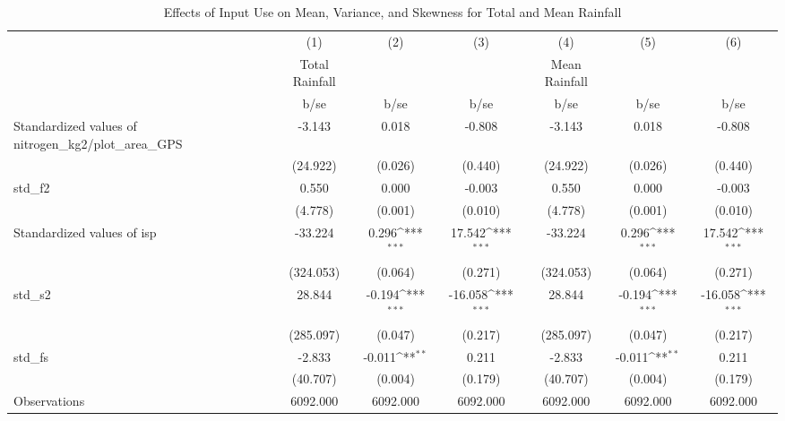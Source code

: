 \begin{table}[htbp]\centering
\def\sym#1{\ifmmode^{#1}\else\(^{#1}\)\fi}
\caption{Effects of Input Use on Mean, Variance, and Skewness for Total and Mean Rainfall}
\begin{tabular}{l*{6}{c}}
\toprule
                &\multicolumn{1}{c}{(1)}&\multicolumn{1}{c}{(2)}&\multicolumn{1}{c}{(3)}&\multicolumn{1}{c}{(4)}&\multicolumn{1}{c}{(5)}&\multicolumn{1}{c}{(6)}\\
                &\multicolumn{1}{c}{Total Rainfall}&\multicolumn{1}{c}{}&\multicolumn{1}{c}{}&\multicolumn{1}{c}{Mean Rainfall}&\multicolumn{1}{c}{}&\multicolumn{1}{c}{}\\
                &     b/se         &     b/se         &     b/se         &     b/se         &     b/se         &     b/se         \\
\midrule
Standardized values of nitrogen\_kg2/plot\_area\_GPS&   -3.143         &    0.018         &   -0.808         &   -3.143         &    0.018         &   -0.808         \\
                & (24.922)         &  (0.026)         &  (0.440)         & (24.922)         &  (0.026)         &  (0.440)         \\
std\_f2          &    0.550         &    0.000         &   -0.003         &    0.550         &    0.000         &   -0.003         \\
                &  (4.778)         &  (0.001)         &  (0.010)         &  (4.778)         &  (0.001)         &  (0.010)         \\
Standardized values of isp&  -33.224         &    0.296\sym{***}&   17.542\sym{***}&  -33.224         &    0.296\sym{***}&   17.542\sym{***}\\
                &(324.053)         &  (0.064)         &  (0.271)         &(324.053)         &  (0.064)         &  (0.271)         \\
std\_s2          &   28.844         &   -0.194\sym{***}&  -16.058\sym{***}&   28.844         &   -0.194\sym{***}&  -16.058\sym{***}\\
                &(285.097)         &  (0.047)         &  (0.217)         &(285.097)         &  (0.047)         &  (0.217)         \\
std\_fs          &   -2.833         &   -0.011\sym{**} &    0.211         &   -2.833         &   -0.011\sym{**} &    0.211         \\
                & (40.707)         &  (0.004)         &  (0.179)         & (40.707)         &  (0.004)         &  (0.179)         \\
\midrule
Observations    & 6092.000         & 6092.000         & 6092.000         & 6092.000         & 6092.000         & 6092.000         \\
\bottomrule
\end{tabular}
\end{table}
